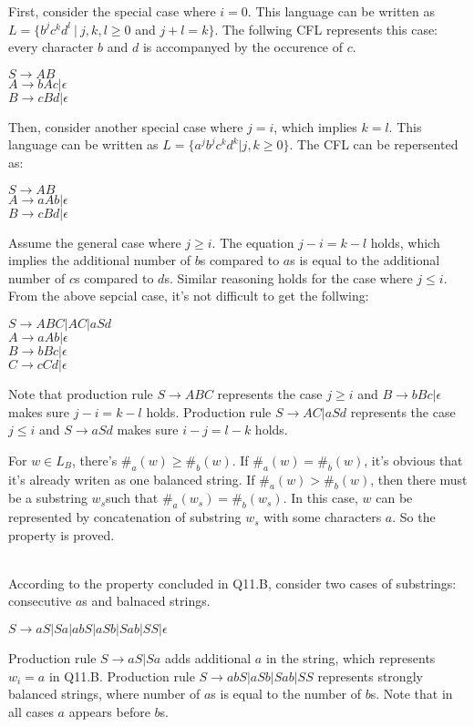 \documentclass[12pt,a4paper]{article}
\newcommand{\question}[1]{\bigskip\noindent{\textbf{Q{#1} solution}}}
\begin{document}
First, consider the special case where $i=0$. This language can be written as $L=\{b^j c^k d^l\ |\ j,k,l \geq 0$ and $j+l=k\}$. The follwing CFL represents this case: every character $b$ and $d$ is accompanyed by the occurence of $c$.
\begin{center}
  $S \rightarrow AB$
  \\$A \rightarrow bAc | \epsilon$
  \\$B \rightarrow cBd | \epsilon$
\end{center}

Then, consider another special case where $j=i$, which implies $k=l$. This language can be written as $L=\{a^j b^j c^k d^k | j,k \geq 0\}$. The CFL can be repersented as:
\begin{center}
  $S \rightarrow AB $
\\$A \rightarrow aAb | \epsilon$
\\$B \rightarrow cBd | \epsilon$
\end{center}

Assume the general case where $j \ge i$. The equation $j - i = k - l$ holds, which implies the additional number of $b$s compared to $a$s is equal to the additional number of $c$s compared to $d$s. Similar reasoning holds for the case where $j \le i$. From the above sepcial case, it's not difficult to get the follwing:
\begin{center}
  $S \rightarrow ABC | AC | aSd$
\\$A \rightarrow aAb | \epsilon$
\\$B \rightarrow bBc | \epsilon$
\\$C \rightarrow cCd | \epsilon$
\end{center}

Note that production rule $S\rightarrow ABC$ represents the case $j \ge i$ and $B\rightarrow bBc | \epsilon$ makes sure $j-i = k-l$ holds. Production rule $S\rightarrow AC|aSd$ represents the case $j \le i$ and $S\rightarrow aSd$ makes sure $i - j = l - k$ holds.

\question{11.B}

For $w \in L_B$, there's $\#_a(w) \ge \#_b(w)$. If $\#_a(w) = \#_b(w)$, it's obvious that it's already writen as one balanced string. If $\#_a(w) > \#_b(w)$, then there must be a substring $w_s$such that $\#_a(w_s) = \#_b(w_s)$. In this case, $w$ can be represented by concatenation of substring $w_s$ with some characters $a$. So the property is proved.

\question{11.C}
\\According to the property concluded in Q11.B, consider two cases of substrings: consecutive $a$s and balnaced strings.
\begin{center}
  $S \rightarrow aS | Sa | abS |aSb | Sab | SS | \epsilon $
\end{center}
Production rule $S \rightarrow aS | Sa$ adds additional $a$ in the string, which represents $w_i = a$ in Q11.B. Production rule $S\rightarrow abS | aSb | Sab | SS$ represents strongly balanced strings, where number of $a$s is equal to the number of $b$s. Note that in all cases $a$ appears before $b$s.
\end{document}
